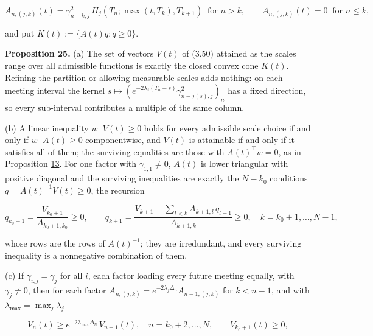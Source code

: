 \documentclass[11pt]{article}
\begin{document}
\begin{equation*}
A_{n,(j,k)}(t) = \gamma_{n-k,j}^2\, H_j(T_n; \max(t, T_k), T_{k+1}) \ \text{ for } n > k, \qquad A_{n,(j,k)}(t) = 0 \ \text{ for } n \le k, \tag{3.111}\label{eq:3.111}
\end{equation*}

and put \(K(t) := \{A(t) q : q \ge 0\}\).

\label{res:Proposition-25}
\textbf{Proposition 25.} (a) The set of vectors \(V(t)\) of (3.50) attained as the scales range over all admissible functions is exactly the closed convex cone \(K(t)\). Refining the partition or allowing measurable scales adds nothing: on each meeting interval the kernel \(s \mapsto (e^{-2\lambda_j (T_n - s)} \gamma_{n - j(s), j}^2)_n\) has a fixed direction, so every sub-interval contributes a multiple of the same column.

(b) A linear inequality \(w^\top V(t) \ge 0\) holds for every admissible scale choice if and only if \(w^\top A(t) \ge 0\) componentwise, and \(V(t)\) is attainable if and only if it satisfies all of them; the surviving equalities are those with \(A(t)^\top w = 0\), as in Proposition \hyperref[res:Proposition-13]{13}. For one factor with \(\gamma_{1,1} \ne 0\), \(A(t)\) is lower triangular with positive diagonal and the surviving inequalities are exactly the \(N - k_0\) conditions \(q = A(t)^{-1} V(t) \ge 0\), the recursion

\begin{equation*}
q_{k_0+1} = \frac{V_{k_0+1}}{A_{k_0+1,k_0}} \ge 0, \qquad q_{k+1} = \frac{V_{k+1} - \sum_{l < k} A_{k+1,l}\, q_{l+1}}{A_{k+1,k}} \ge 0, \quad k = k_0 + 1, \dots, N - 1, \tag{3.112}\label{eq:3.112}
\end{equation*}

whose rows are the rows of \(A(t)^{-1}\); they are irredundant, and every surviving inequality is a nonnegative combination of them.

(c) If \(\gamma_{i,j} = \gamma_j\) for all \(i\), each factor loading every future meeting equally, with \(\gamma_j \ne 0\), then for each factor \(A_{n,(j,k)} = e^{-2\lambda_j \Delta_n} A_{n-1,(j,k)}\) for \(k < n - 1\), and with \(\lambda_{\max} = \max_j \lambda_j\)

\begin{equation*}
V_n(t) \ge e^{-2\lambda_{\max} \Delta_n}\, V_{n-1}(t), \quad n = k_0 + 2, \dots, N, \qquad V_{k_0+1}(t) \ge 0, \tag{3.113}\label{eq:3.113}
\end{equation*}
\end{document}
